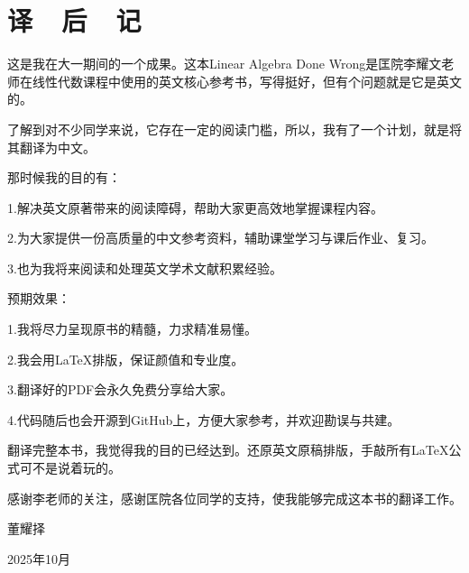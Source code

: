 

\chapter{译~~后~~记}

这是我在大一期间的一个成果。这本Linear Algebra Done Wrong是匡院李耀文老师在线性代数课程中使用的英文核心参考书，写得挺好，但有个问题就是它是英文的。

了解到对不少同学来说，它存在一定的阅读门槛，所以，我有了一个计划，就是将其翻译为中文。

那时候我的目的有：

1.解决英文原著带来的阅读障碍，帮助大家更高效地掌握课程内容。

2.为大家提供一份高质量的中文参考资料，辅助课堂学习与课后作业、复习。

3.也为我将来阅读和处理英文学术文献积累经验。

预期效果：

1.我将尽力呈现原书的精髓，力求精准易懂。

2.我会用\LaTeX{}排版，保证颜值和专业度。

3.翻译好的PDF会永久免费分享给大家。

4.代码随后也会开源到GitHub上，方便大家参考，并欢迎勘误与共建。

翻译完整本书，我觉得我的目的已经达到。还原英文原稿排版，手敲所有\LaTeX{}公式可不是说着玩的。

感谢李老师的关注，感谢匡院各位同学的支持，使我能够完成这本书的翻译工作。


\vspace{5ex}
\begin{flushright}
董耀择~~~~~~~~~

2025年10月~~~~~
\end{flushright}

